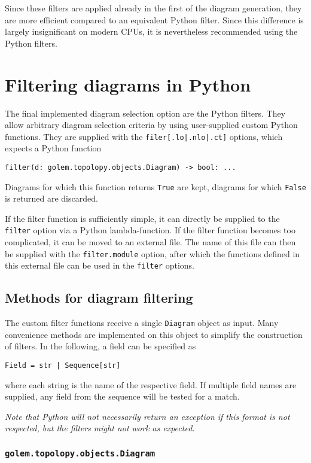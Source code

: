 \documentclass[11pt,a4paper]{refrep}
\newcommand{\python}{{Python}\xspace}
\begin{document}
Since these filters are applied already in the first of the diagram generation, they are more efficient compared to an equivalent \python filter. Since this difference is largely insignificant on modern CPUs, it is nevertheless recommended using the \python filters.

\section{Filtering diagrams in \python{}}
\label{sec:filter}
The final implemented diagram selection option are the \python filters. They allow arbitrary diagram selection criteria by using user-supplied custom \python functions. They are supplied with the \texttt{filer[.lo|.nlo|.ct]} options, which expects a \python function
\begin{lstlisting}[style=py]
   filter(d: golem.topolopy.objects.Diagram) -> bool: ...
\end{lstlisting}
Diagrams for which this function returns \texttt{True} are kept, diagrams for which \texttt{False} is returned are discarded.

If the filter function is sufficiently simple, it can directly be supplied to the \texttt{filter} option via a \python lambda-function. If the filter function becomes too complicated, it can be moved to an external file. The name of this file can then be supplied with the \texttt{filter.module} option, after which the functions defined in this external file can be used in the \texttt{filter} options.

\subsection{Methods for diagram filtering}
The custom filter functions receive a single \texttt{Diagram} object as input. Many convenience methods are implemented on this object to simplify the construction of filters. In the following, a field can be specified as 
\begin{lstlisting}[style=py]
   Field = str | Sequence[str]
\end{lstlisting}
where each string is the name of the respective field. If multiple field names are supplied, any field from the sequence will be tested for a match.

\emph{Note that Python will not necessarily return an exception if this format is not respected, but the filters might not work as expected.} 

\subsubsection{\texttt{golem.topolopy.objects.Diagram}}
\begin{adjustwidth}{-100pt}{0pt}

\end{adjustwidth}
\end{document}
